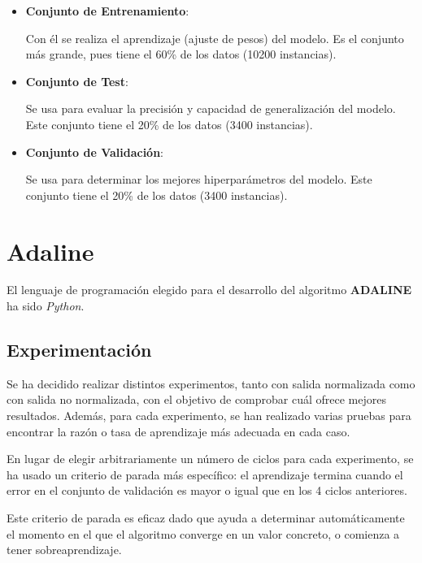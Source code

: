 \documentclass{uc3mpracticas}
\begin{document}
  \begin{itemize}
    \item \textbf{Conjunto de Entrenamiento}:

    Con él se realiza el aprendizaje (ajuste de pesos) del modelo. Es el conjunto más grande, pues tiene el 60\% de los datos (10200 instancias).

    \item \textbf{Conjunto de Test}:

    Se usa para evaluar la precisión y capacidad de generalización del modelo. Este conjunto tiene el 20\% de los datos (3400 instancias).

    \item \textbf{Conjunto de Validación}:

    Se usa para determinar los mejores hiperparámetros del modelo. Este conjunto tiene el 20\% de los datos (3400 instancias).

  \end{itemize}

  \section{Adaline}

  El lenguaje de programación elegido para el desarrollo del algoritmo \textbf{ADALINE} ha sido \textit{Python}.

    \subsection{Experimentación}

    Se ha decidido realizar distintos experimentos, tanto con salida normalizada como con salida no normalizada, con el objetivo de comprobar cuál ofrece mejores resultados. Además, para cada experimento, se han realizado varias pruebas para encontrar la razón o tasa de aprendizaje más adecuada en cada caso.

    \vspace{3mm}

    En lugar de elegir arbitrariamente un número de ciclos para cada experimento, se ha usado un criterio de parada más específico: el aprendizaje termina cuando el error en el conjunto de validación es mayor o igual que en los 4 ciclos anteriores.

    \vspace{3mm}

    Este criterio de parada es eficaz dado que ayuda a determinar automáticamente el momento en el que el algoritmo converge en un valor concreto, o comienza a tener sobreaprendizaje.
\end{document}
